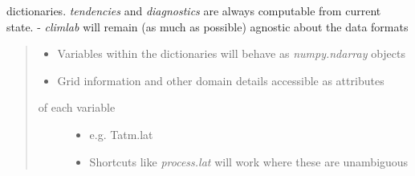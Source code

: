 \documentclass[letterpaper,10pt,english]{sphinxmanual}
\begin{document}
dictionaries. \emph{tendencies} and \emph{diagnostics} are always computable from current
state.
- \emph{climlab} will remain (as much as possible) agnostic about the data formats
\begin{quote}
\begin{itemize}
\item {} 
Variables within the dictionaries will behave as \emph{numpy.ndarray} objects

\item {} 
Grid information and other domain details accessible as attributes

\end{itemize}
\begin{description}
\item[{of each variable}] \leavevmode\begin{itemize}
\item {} 
e.g. Tatm.lat

\item {} 
Shortcuts like \emph{process.lat} will work where these are unambiguous

\end{itemize}

\end{description}
\end{quote}
\end{document}
